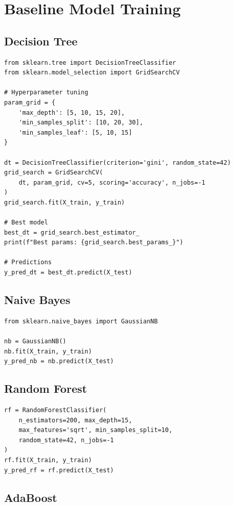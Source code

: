 \section{Baseline Model Training}

\subsection{Decision Tree}

\begin{verbatim}
from sklearn.tree import DecisionTreeClassifier
from sklearn.model_selection import GridSearchCV

# Hyperparameter tuning
param_grid = {
    'max_depth': [5, 10, 15, 20],
    'min_samples_split': [10, 20, 30],
    'min_samples_leaf': [5, 10, 15]
}

dt = DecisionTreeClassifier(criterion='gini', random_state=42)
grid_search = GridSearchCV(
    dt, param_grid, cv=5, scoring='accuracy', n_jobs=-1
)
grid_search.fit(X_train, y_train)

# Best model
best_dt = grid_search.best_estimator_
print(f"Best params: {grid_search.best_params_}")

# Predictions
y_pred_dt = best_dt.predict(X_test)
\end{verbatim}

\subsection{Naive Bayes}

\begin{verbatim}
from sklearn.naive_bayes import GaussianNB

nb = GaussianNB()
nb.fit(X_train, y_train)
y_pred_nb = nb.predict(X_test)
\end{verbatim}

\subsection{Random Forest}

\begin{verbatim}
rf = RandomForestClassifier(
    n_estimators=200, max_depth=15, 
    max_features='sqrt', min_samples_split=10,
    random_state=42, n_jobs=-1
)
rf.fit(X_train, y_train)
y_pred_rf = rf.predict(X_test)
\end{verbatim}

\subsection{AdaBoost}

